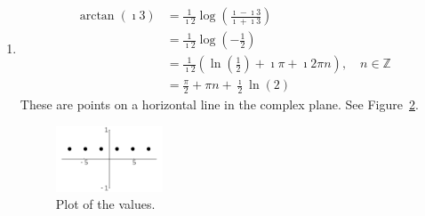 {\begin{Solution}
\begin{enumerate}
\begin{figure}[htbp!]
\begin{center}
    \end{center}
    \caption{Plot of the values.}
    \label{figure log11i}
  \end{figure}
\item 
  \begin{align*}
    \arctan(\imath 3)
    &= \frac{1}{\imath 2} \log \left( \frac{ \imath - \imath 3 }{ \imath + \imath 3 } \right)
    \\
    &= \frac{1}{\imath 2} \log \left( - \frac{1}{2} \right)
    \\
    &= \frac{1}{\imath 2} \left( \ln \left( \frac{1}{2} \right) 
      + \imath \pi + \imath 2 \pi n \right), \quad n \in \mathbb{Z}
    \\
    &= \frac{\pi}{2} + \pi n + \frac{\imath}{2} \ln(2)
  \end{align*}
  These are points on a horizontal line in the complex plane.
  See Figure~\ref{figure arctani3}.
  \begin{figure}[htbp!]
    \begin{center}
      \includegraphics[width=0.3\textwidth]{fcv/function/arctani3}
    \end{center}
    \caption{Plot of the values.}
    \label{figure arctani3}
  \end{figure}
\end{enumerate}
\end{Solution}
}









